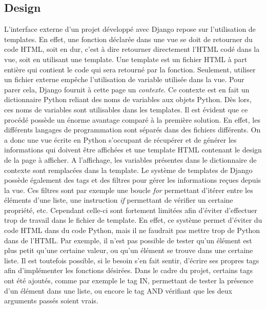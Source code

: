 \documentclass[12pt, a4paper, oneside]{article}
\begin{document}
{{\subsection{Design}
    \indent L'interface externe d'un projet développé avec Django repose sur l'utilisation de templates. En effet, une fonction déclarée dans une vue se doit de retourner du code HTML, soit en dur, c'est à dire retourner directement l'HTML codé dans la vue, soit en utilisant une template. Une template est un fichier HTML à part entière qui contient le code qui sera retourné par la fonction. Seulement, utiliser un fichier externe empêche l'utilisation de variable utilisée dans la vue. Pour parer cela, Django fournit à cette page un \textit{contexte}. Ce contexte est en fait un dictionnaire Python reliant des noms de variables aux objets Python. Dès lors, ces noms de variables sont utilisables dans les templates. Il est évident que ce procédé possède un énorme avantage comparé à la première solution. En effet, les différents langages de programmation sont séparés dans des fichiers différents. On a donc une vue écrite en Python s'occupant de récupérer et de générer les informations qui doivent être affichées et une template HTML contenant le design de la page à afficher. A l'affichage, les variables présentes dans le dictionnaire de contexte sont remplacées dans la template. Le système de templates de Django possède également des tags et des filtres pour gérer les informations reçues depuis la vue. Ces filtres sont par exemple une boucle \textit{for} permettant d'itérer entre les éléments d'une liste, une instruction \textit{if} permettant de vérifier un certaine propriété, etc. Cependant celle-ci sont fortement limitées afin d'éviter d'effectuer trop de travail dans le fichier de template. En effet, ce système permet d'éviter du code HTML dans du code Python, mais il ne faudrait pas mettre trop de Python dans de l'HTML. Par exemple, il n'est pas possible de tester qu'un élément est plus petit qu'une certaine valeur, ou qu'un élément se trouve dans une certaine liste. Il est toutefois possible, si le besoin s'en fait sentir, d'écrire ses propres tags afin d'implémenter les fonctions désirées. Dans le cadre du projet, certains tags ont été ajoutés, comme par exemple le tag IN, permettant de tester la présence d'un élément dans une liste, ou encore le tag AND vérifiant que les deux arguments passés soient vrais.\\\\
}}
\end{document}
